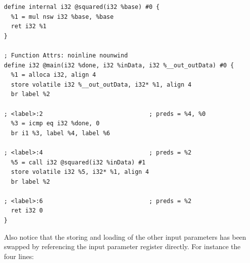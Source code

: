 \begin{lstlisting}[caption={LLVM IR after LTO},label=lst:llvmirpostlto]
define internal i32 @squared(i32 %base) #0 {
  %1 = mul nsw i32 %base, %base
  ret i32 %1
}

; Function Attrs: noinline nounwind
define i32 @main(i32 %done, i32 %inData, i32 %__out_outData) #0 {
  %1 = alloca i32, align 4
  store volatile i32 %__out_outData, i32* %1, align 4
  br label %2

; <label>:2                              ; preds = %4, %0
  %3 = icmp eq i32 %done, 0
  br i1 %3, label %4, label %6

; <label>:4                              ; preds = %2
  %5 = call i32 @squared(i32 %inData) #1
  store volatile i32 %5, i32* %1, align 4
  br label %2

; <label>:6                              ; preds = %2
  ret i32 0
}
\end{lstlisting}

Also notice that the storing and loading of the other input parameters has been swapped by referencing the input parameter register directly. For instance the four lines:


